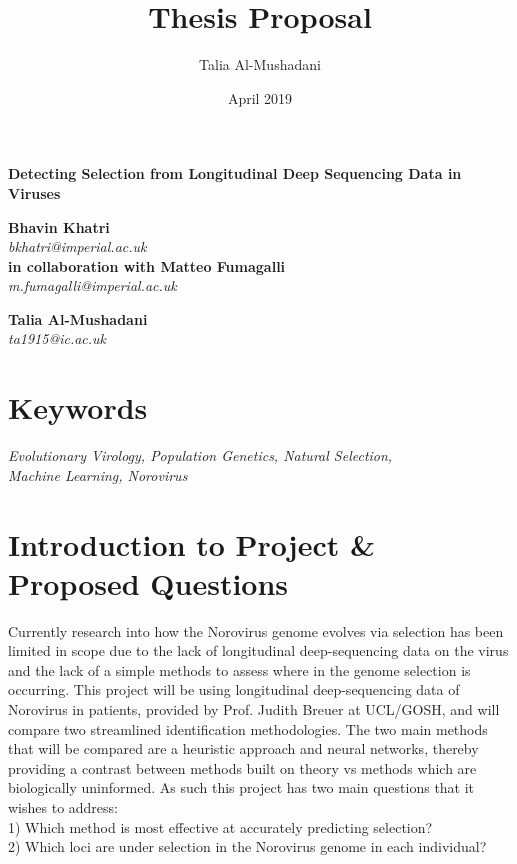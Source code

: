 \documentclass[a4paper, margin=2cm, 11pt]{article}
\title{Thesis Proposal}
\author{Talia Al-Mushadani}
\date{April 2019}
\begin{document}
\begin{onehalfspacing}
\begin{titlepage}
    \begin{center}
        \Huge
        \textbf{Detecting Selection from Longitudinal Deep Sequencing Data in Viruses}
        
        \vspace{2cm}
        \LARGE
        \textbf{Bhavin Khatri}
        \\
        \textsl{bkhatri@imperial.ac.uk}
        \vspace{0.5cm}
        \\
        \textbf{in collaboration with Matteo Fumagalli}
        \\
        \textsl{m.fumagalli@imperial.ac.uk}
        
        \vspace{9cm}
        \LARGE
        \textbf{Talia Al-Mushadani}
        \\
        \textsl{ta1915@ic.ac.uk}
    \end{center}
\end{titlepage}

\linenumbers

\section{Keywords}
\textsl{Evolutionary Virology, Population Genetics, Natural Selection, \\ Machine Learning, Norovirus} 

\section{Introduction to Project \& Proposed Questions}
Currently research into how the Norovirus genome evolves via selection has been limited in scope \citep{Steyer2018} due to the lack of longitudinal deep-sequencing data on the virus and the lack of a simple methods to assess where in the genome selection is occurring. This project will be using longitudinal deep-sequencing data of Norovirus in patients, provided by Prof. Judith Breuer at UCL/GOSH, and will compare two streamlined identification methodologies. The two main methods that will be compared are a heuristic approach \citep{Khatri2016} and neural networks, thereby providing a contrast between methods built on theory vs methods which are biologically uninformed.
As such this project has two main questions that it wishes to address:
\\
1) Which method is most effective at accurately predicting selection?
\\
2) Which loci are under selection in the Norovirus genome in each individual?


\end{onehalfspacing}
\end{document}
